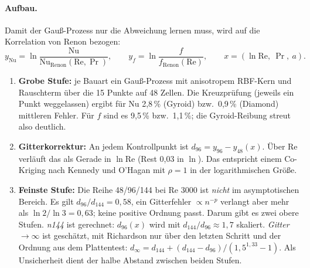 \paragraph{Aufbau.} Damit der Gauß-Prozess nur die Abweichung lernen muss, wird auf die Korrelation von Renon
\cite{renon2024} bezogen:
\[
  y_\mathrm{Nu} = \ln\frac{\mathrm{Nu}}{\mathrm{Nu}_\mathrm{Renon}(\mathrm{Re},\Pr)},\qquad
  y_f = \ln\frac{f}{f_\mathrm{Renon}(\mathrm{Re})},\qquad x = (\ln\mathrm{Re},\ \Pr,\ a).
\]
\begin{enumerate}
\item \textbf{Grobe Stufe:} je Bauart ein Gauß-Prozess mit anisotropem RBF-Kern und Rauschterm über die 15 Punkte auf
  48 Zellen. Die Kreuzprüfung (jeweils ein Punkt weggelassen) ergibt für Nu 2,8\,\% (Gyroid) bzw.\ 0,9\,\% (Diamond)
  mittleren Fehler. Für $f$ sind es 9,5\,\% bzw.\ 1,1\,\%; die Gyroid-Reibung streut also deutlich.
\item \textbf{Gitterkorrektur:} An jedem Kontrollpunkt ist $d_{96} = y_{96} - y_{48}(x)$. Über Re verläuft das als
  Gerade in $\ln\mathrm{Re}$ (Rest 0,03 in $\ln$). Das entspricht einem Co-Kriging nach Kennedy und O'Hagan
  \cite{kennedy2000} mit $\rho = 1$ in der logarithmischen Größe.
\item \textbf{Feinste Stufe:} Die Reihe 48/96/144 bei Re 3000 ist \emph{nicht} im asymptotischen Bereich. Es gilt
  $d_{96}/d_{144} = 0{,}58$, ein Gitterfehler $\propto n^{-p}$ verlangt aber mehr als $\ln 2/\ln 3 = 0{,}63$; keine
  positive Ordnung passt. Darum gibt es zwei obere Stufen. \emph{n144} ist gerechnet: $d_{96}(x)$ wird mit
  $d_{144}/d_{96} \approx 1{,}7$ skaliert. \emph{Gitter $\to\infty$} ist geschätzt, mit Richardson nur über den letzten
  Schritt und der Ordnung aus dem Plattentest:
  $d_\infty = d_{144} + (d_{144}-d_{96})/(1{,}5^{1{,}33}-1)$. Als Unsicherheit dient der halbe Abstand zwischen beiden
  Stufen.
\end{enumerate}

